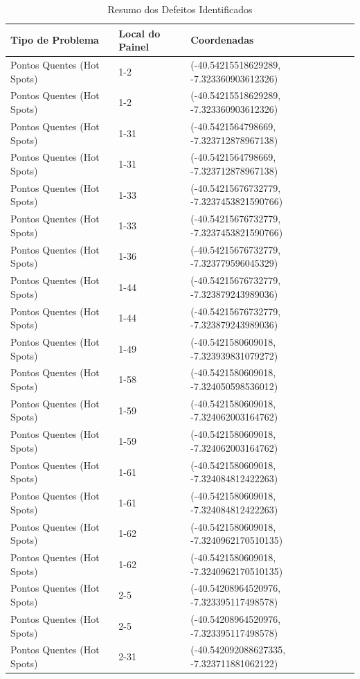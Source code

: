\documentclass[dvipsnames]{article}%
\begin{document}
\begin{table}[h!]%
\caption{Resumo dos Defeitos Identificados}%
\begin{tabular}{lll}%
\toprule%
Tipo de Problema&Local do Painel&Coordenadas\\%
\midrule%
Pontos Quentes (Hot Spots)&1{-}2&({-}40.54215518629289, {-}7.323360903612326)\\%
Pontos Quentes (Hot Spots)&1{-}2&({-}40.54215518629289, {-}7.323360903612326)\\%
Pontos Quentes (Hot Spots)&1{-}31&({-}40.5421564798669, {-}7.323712878967138)\\%
Pontos Quentes (Hot Spots)&1{-}31&({-}40.5421564798669, {-}7.323712878967138)\\%
Pontos Quentes (Hot Spots)&1{-}33&({-}40.54215676732779, {-}7.3237453821590766)\\%
Pontos Quentes (Hot Spots)&1{-}33&({-}40.54215676732779, {-}7.3237453821590766)\\%
Pontos Quentes (Hot Spots)&1{-}36&({-}40.54215676732779, {-}7.323779596045329)\\%
Pontos Quentes (Hot Spots)&1{-}44&({-}40.54215676732779, {-}7.323879243989036)\\%
Pontos Quentes (Hot Spots)&1{-}44&({-}40.54215676732779, {-}7.323879243989036)\\%
Pontos Quentes (Hot Spots)&1{-}49&({-}40.5421580609018, {-}7.323939831079272)\\%
Pontos Quentes (Hot Spots)&1{-}58&({-}40.5421580609018, {-}7.324050598536012)\\%
Pontos Quentes (Hot Spots)&1{-}59&({-}40.5421580609018, {-}7.324062003164762)\\%
Pontos Quentes (Hot Spots)&1{-}59&({-}40.5421580609018, {-}7.324062003164762)\\%
Pontos Quentes (Hot Spots)&1{-}61&({-}40.5421580609018, {-}7.324084812422263)\\%
Pontos Quentes (Hot Spots)&1{-}61&({-}40.5421580609018, {-}7.324084812422263)\\%
Pontos Quentes (Hot Spots)&1{-}62&({-}40.5421580609018, {-}7.3240962170510135)\\%
Pontos Quentes (Hot Spots)&1{-}62&({-}40.5421580609018, {-}7.3240962170510135)\\%
Pontos Quentes (Hot Spots)&2{-}5&({-}40.54208964520976, {-}7.323395117498578)\\%
Pontos Quentes (Hot Spots)&2{-}5&({-}40.54208964520976, {-}7.323395117498578)\\%
Pontos Quentes (Hot Spots)&2{-}31&({-}40.542092088627335, {-}7.323711881062122)\\%

\end{tabular}
\end{table}
\end{document}
